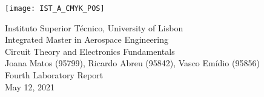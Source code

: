 \thispagestyle {empty}

\texttt{[image: IST\_A\_CMYK\_POS]}

\begin{center}
%
\vspace{1.0cm}

\vspace{1cm}
{\FontLb Instituto Superior Técnico, University of Lisbon} \\ %
\vspace{1cm}
{\FontLb Integrated Master in Aerospace Engineering} \\ %
\vspace{1cm}
{\FontSn Circuit Theory and Electronics Fundamentals} \\ %
\vspace{1cm}
{\FontSn Joana Matos (95799), Ricardo Abreu (95842), Vasco Emídio (95856)} \\ %
\vspace{1cm}
{\FontSn Fourth Laboratory Report} \\
\vspace{1cm}
{\FontSn May 12, 2021} \\ %
%
\end{center}

